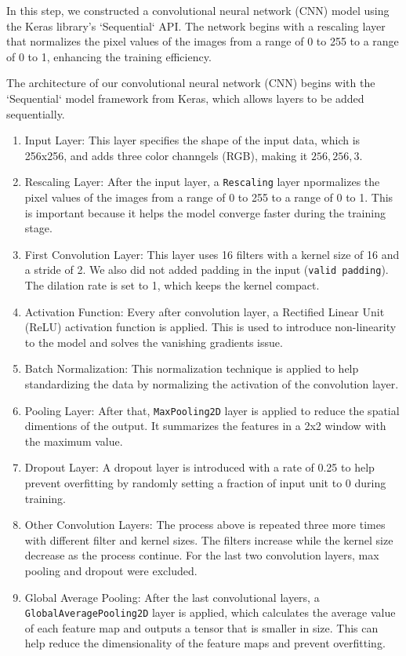 In this step, we constructed a convolutional neural network (CNN) model using the Keras library's `Sequential` API. The network begins with a rescaling layer that normalizes the pixel values of the images from a range of 0 to 255 to a range of 0 to 1, enhancing the training efficiency. 

The architecture of our convolutional neural network (CNN) begins with the `Sequential` model framework from Keras, which allows layers to be added sequentially. 

\begin{enumerate}
  \item Input Layer: This layer specifies the shape of the input data, which is 256x256, and adds three color channgels (RGB), making it \(256, 256, 3\).
  \item Rescaling Layer: After the input layer, a \texttt{Rescaling} layer npormalizes the pixel values of the images from a range of 0 to 255 to a range of 0 to 1. This is important because it helps the model converge faster during the training stage.
  \item First Convolution Layer: This layer uses 16 filters with a kernel size of 16 and a stride of 2. We also did not added padding in the input (\texttt{valid padding}). The dilation rate is set to 1, which keeps the kernel compact.
  \item Activation Function: Every after convolution layer, a Rectified Linear Unit (ReLU) activation function is applied. This is used to introduce non-linearity to the model and solves the vanishing gradients issue.
  \item Batch Normalization: This normalization technique is applied to help standardizing the data by normalizing the activation of the convolution layer.
  \item Pooling Layer: After that, \texttt{MaxPooling2D} layer is applied to reduce the spatial dimentions of the output. It summarizes the features in a 2x2 window with the maximum value.
  \item Dropout Layer: A dropout layer is introduced with a rate of 0.25 to help prevent overfitting by randomly setting a fraction of input unit to 0 during training.
  \item Other Convolution Layers: The process above is repeated three more times with different filter and kernel sizes. The filters increase while the kernel size decrease as the process continue. For the last two convolution layers, max pooling and dropout were excluded.
  \item Global Average Pooling: After the last convolutional layers, a \texttt{GlobalAveragePooling2D} layer is applied, which calculates the average value of each feature map and outputs a tensor that is smaller in size. This can help reduce the dimensionality of the feature maps and prevent overfitting. 

\end{enumerate}
